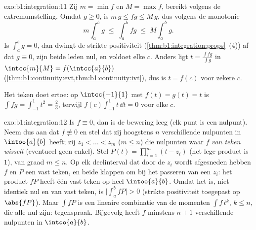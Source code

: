 \begin{solution}{exo:b1:integration:11}
Zij $m = \min f$ en $M = \max f$, bereikt volgens de
extremumstelling. Omdat $g \geq 0$, is $m\,g \leq fg \leq M\,g$, dus
volgens de monotonie
\[
m \int_a^b g \;\leq\; \int_a^b fg \;\leq\; M \int_a^b g .
\]
Is $\int_a^b g = 0$, dan dwingt de strikte positiviteit
(\cref{thm:b1:integration:props}~(4)) af dat $g \equiv 0$, zijn
beide leden nul, en voldoet elke $c$. Anders ligt $t = \frac{\int
fg}{\int g}$ in $\intcc{m}{M} = f(\intcc{a}{b})$
(\cref{thm:b1:continuity:evt,thm:b1:continuity:ivt}), dus is $t =
f(c)$ voor zekere $c$.

Het teken doet ertoe: op $\intcc{-1}{1}$ met $f(t) = g(t) = t$ is
$\int fg = \int_{-1}^1 t^2 = \frac23$, terwijl $f(c)\int_{-1}^1
t\,\dd t = 0$ voor elke $c$.
\end{solution}

\begin{solution}{exo:b1:integration:12}
Is $f \equiv 0$, dan is de bewering leeg (elk punt is een nulpunt).
Neem dus aan dat $f \not\equiv 0$ en stel dat zij hoogstens $n$
verschillende nulpunten in $\intoo{a}{b}$ heeft; zij $z_1 < \dots <
z_m$ ($m \leq n$) die nulpunten waar $f$ \emph{van teken wisselt}
(eventueel geen enkel). Stel $P(t) = \prod_{i=1}^{m}(t - z_i)$ (het
lege product is $1$), van graad $m \leq n$. Op elk deelinterval dat
door de $z_i$ wordt afgesneden hebben $f$ en $P$ een vast teken, en
beide klappen om bij het passeren van een $z_i$: het product $fP$
heeft één vast teken op heel $\intoo{a}{b}$. Omdat het  is,
niet identiek nul en van vast teken, is $\bigl|\int_a^b fP\bigr| >
0$ (strikte positiviteit toegepast op $\abs{fP}$). Maar $\int f P$
is een lineaire combinatie van de momenten $\int f\,t^k$, $k \leq
n$, die alle nul zijn: tegenspraak. Bijgevolg heeft $f$ minstens $n
+ 1$ verschillende nulpunten in $\intoo{a}{b}$.
\end{solution}

